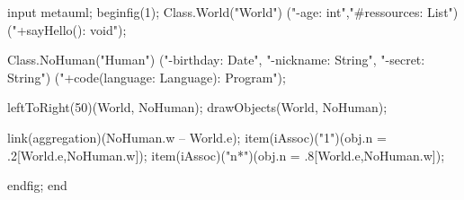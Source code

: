 input metauml;
beginfig(1);
    Class.World("World")
           ("-age: int","#ressources: List") 
           ("+sayHello(): void");

    Class.NoHuman("Human")
           ("-birthday: Date",
            "-nickname: String",
            "-secret: String") 
           ("+code(language: Language): Program");

    leftToRight(50)(World, NoHuman);
    drawObjects(World, NoHuman);

    link(aggregation)(NoHuman.w -- World.e);
    item(iAssoc)("1")(obj.n     = .2[World.e,NoHuman.w]);
    item(iAssoc)("n*")(obj.n  = .8[World.e,NoHuman.w]);

endfig;
end